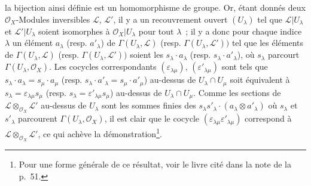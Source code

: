 \begin{env}[5.4.7]

la bijection ainsi définie est un homomorphisme de groupe. Or, étant donnés
deux $\mathcal{O}_X$-Modules inversibles $\mathcal{L}$, $\mathcal{L}'$, il y a
un recouvrement ouvert $(U_\lambda)$ tel que $\mathcal{L}|U_\lambda$ et
$\mathcal{L}'|U_\lambda$ soient isomorphes à $\mathcal{O}_X|U_\lambda$ pour
tout $\lambda$~; il y a donc pour chaque indice $\lambda$ un élément
$a_\lambda$ (resp. $a'_\lambda$) de $\Gamma(U_\lambda,\mathcal{L})$ (resp.
$\Gamma(U_\lambda,\mathcal{L}'))$ tel que les éléments de
$\Gamma(U_\lambda,\mathcal{L})$ (resp. $\Gamma(U_\lambda,\mathcal{L}'))$
soient les $s_\lambda\cdot a_\lambda$ (resp.
$s_\lambda\cdot a'_\lambda$), où $s_\lambda$ parcourt
$\Gamma(U_\lambda,\mathcal{O}_X)$. Les cocycles correspondants
$(\varepsilon_{\lambda\mu})$, $(\varepsilon'_{\lambda\mu})$ sont tels que
$s_\lambda\cdot a_\lambda=s_\mu\cdot a_\mu$ (resp.
$s_\lambda\cdot a'_\lambda=s_\mu\cdot a'_\mu$) au-dessus de
$U_\lambda\cap U_\mu$ soit équivalent à
$s_\lambda=\varepsilon_{\lambda\mu}s_\mu$ (resp.
$s_\lambda=\varepsilon'_{\lambda\mu}s_\mu$) au-dessus de
$U_\lambda\cap U_\mu$. Comme les sections de
$\mathcal{L}\otimes_{\mathcal{O}_X}\mathcal{L}'$ au-dessus de $U_\lambda$
sont les sommes finies des
$s_\lambda s'_\lambda\cdot(a_\lambda\otimes a'_\lambda)$ où $s_\lambda$ et
$s'_\lambda$ parcourent $\Gamma(U_\lambda,\mathcal{O}_X)$, il est clair que
le cocycle $(\varepsilon_{\lambda\mu}\varepsilon'_{\lambda\mu})$ correspond
à $\mathcal{L}\otimes_{\mathcal{O}_X}\mathcal{L}'$, ce qui achève la
démonstration\footnote{Pour une forme générale de ce résultat, voir le livre
cité dans la note de la p.~51.}.
\end{env}


